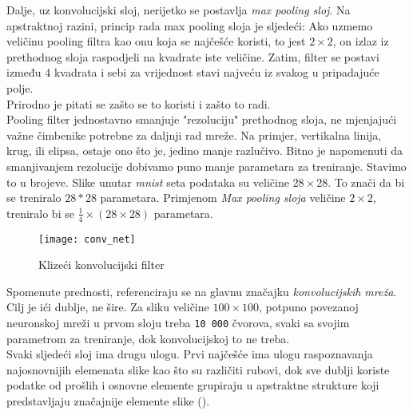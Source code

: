Dalje, uz konvolucijski sloj, nerijetko se postavlja \emph{max pooling sloj}.
Na apstraktnoj razini, princip rada max pooling sloja je sljedeći: Ako uzmemo veličinu pooling filtra kao onu koja se najčešće koristi, to jest $2\times2$, on izlaz iz prethodnog sloja raspodjeli na kvadrate iste veličine. Zatim, filter se postavi između 4 kvadrata i sebi za vrijednost stavi najveću iz svakog u pripadajuće polje. \\ 
Prirodno je pitati se zašto se to koristi i zašto to radi. \\
Pooling filter jednostavno smanjuje "rezoluciju" prethodnog sloja, ne mjenjajući važne čimbenike potrebne za daljnji rad mreže. Na primjer, vertikalna linija, krug, ili elipsa, ostaje ono što je, jedino manje razlučivo. 
Bitno je napomenuti da smanjivanjem rezolucije dobivamo puno manje parametara za treniranje. 
Stavimo to u brojeve.
Slike unutar \emph{mnist} seta podataka su veličine $28\times28$.
To znači da bi se treniralo $28*28$ parametara. Primjenom \emph{Max pooling sloja} veličine $2\times2$, treniralo bi se $\frac{1}{4}\times(28\times28)$ parametara. 

\begin{figure}[h!]
	\centering
	\texttt{[image: conv\_net]}
	 \caption{Klizeći konvolucijski filter}
 	 \label{fig:conv_net_1}
\end{figure}

Spomenute prednosti, referenciraju se na glavnu značajku \emph{konvolucijskih mreža}. 
Cilj je ići dublje, ne šire. 
Za sliku veličine $100\times100$, potpuno povezanoj neuronskoj mreži u prvom sloju treba \texttt{10 000} čvorova, svaki sa svojim parametrom za treniranje, dok konvolucijskoj to ne treba. \\
Svaki sljedeći sloj ima drugu ulogu. 
Prvi najčešće ima ulogu raspoznavanja najosnovnijih elemenata slike kao što su različiti rubovi, dok sve dublji koriste podatke od prošlih i osnovne elemente grupiraju u apstraktne strukture koji predstavljaju značajnije elemente slike (\cite{o2015introduction}).
